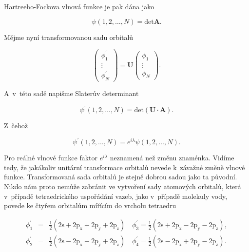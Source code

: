 \noindent Hartreeho-Fockova vlnová funkce je pak dána jako


\begin{equation}
\psi(1,2, \dots, N) = \mbox{det} \mathbf{A}.
\label{rov:ElStrukt-30}
\end{equation}


\noindent Mějme nyní transformovanou sadu orbitalů


\begin{equation}
\begin{pmatrix}
\phi_1^{\prime} \\
\vdots \\
\phi_N^{\prime}
\end{pmatrix}
= \mathbf{U} 
\begin{pmatrix}
\phi_1 \\
\vdots \\
\phi_N
\end{pmatrix}.
\label{rov:ElStrukt-31}
\end{equation}


\noindent A~v~této sadě napišme Slaterův determinant

\begin{equation}
\psi^{\prime}(1,2, \dots, N) = \mbox{det} ( \mathbf{U} \cdot \mathbf{A}).
\label{rov:ElStrukt-32}
\end{equation}

\noindent Z~čehož 

\begin{equation}
\psi^{\prime}(1,2, \dots, N) = e^{i \lambda} \psi(1,2, \dots, N).
\label{rov:ElStrukt-33}
\end{equation}

\noindent Pro reálné vlnové funkce faktor $e^{i\lambda}$  neznamená než změnu znaménka.
Vidíme tedy, že jakákoliv unitární transformace orbitalů nevede k~závažné změně vlnové funkce. Transformovaná sada orbitalů je stejně dobrou sadou jako ta původní. Nikdo nám proto nemůže zabránit ve vytvoření sady atomových orbitalů, která v~případě tetraedrického uspořádání vazeb, jako v~případě molekuly vody, povede ke čtyřem orbitalům mířícím do vrcholu tetraedru


\begin{eqnarray}
\phi^{\prime}_1 &=& \frac{1}{2} ( 2 \mathrm{s} + 2 \mathrm{p_x} + 2 \mathrm{p_y} + 2 \mathrm{p_z}) \quad \phi^{\prime}_3 = \frac{1}{2} ( 2 \mathrm{s} + 2 \mathrm{p_x} - 2 \mathrm{p_y} - 2 \mathrm{p_z}), \nonumber \\
\phi^{\prime}_2 &=& \frac{1}{2} ( 2 \mathrm{s} - 2 \mathrm{p_x} - 2 \mathrm{p_y} + 2 \mathrm{p_z}) \quad \phi^{\prime}_4 = \frac{1}{2} ( 2 \mathrm{s} - 2 \mathrm{p_x} + 2 \mathrm{p_y} - 2 \mathrm{p_z}).
\label{rov:ElStrukt-34}
\end{eqnarray}


